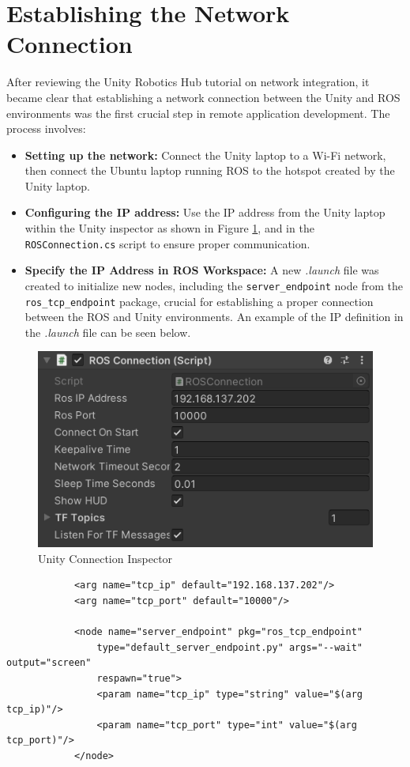     \section{Establishing the Network Connection}
    After reviewing the Unity Robotics Hub tutorial on network integration, it became clear that establishing a network connection between the Unity and ROS environments was the first crucial step in remote application development. The process involves:
    \begin{itemize}
        \item \textbf{Setting up the network:} Connect the Unity laptop to a Wi-Fi network, then connect the Ubuntu laptop running ROS to the hotspot created by the Unity laptop.
        \item \textbf{Configuring the IP address:} Use the IP address from the Unity laptop within the Unity inspector as shown in Figure \ref{fig:unity_connection}, and in the \texttt{ROSConnection.cs} script to ensure proper communication.
        \item \textbf{Specify the IP Address in ROS Workspace:} A new \textit{.launch} file was created to initialize new nodes, including the \texttt{server\_endpoint} node from the \texttt{ros\_tcp\_endpoint} package, crucial for establishing a proper connection between the ROS and Unity environments. An example of the IP definition in the \textit{.launch} file can be seen below.
    \end{itemize}
    
    \begin{figure}[htbp]
        \centering
        \includegraphics[width=0.5\linewidth]{figs/connection_inspector.png}
        \caption{Unity Connection Inspector}
        \label{fig:unity_connection}
    \end{figure}
    
    \begin{verbatim}
            <arg name="tcp_ip" default="192.168.137.202"/>
            <arg name="tcp_port" default="10000"/>
            
            <node name="server_endpoint" pkg="ros_tcp_endpoint" 
                type="default_server_endpoint.py" args="--wait" output="screen" 
                respawn="true">
                <param name="tcp_ip" type="string" value="$(arg tcp_ip)"/>
                <param name="tcp_port" type="int" value="$(arg tcp_port)"/>
            </node>
    \end{verbatim}
    
